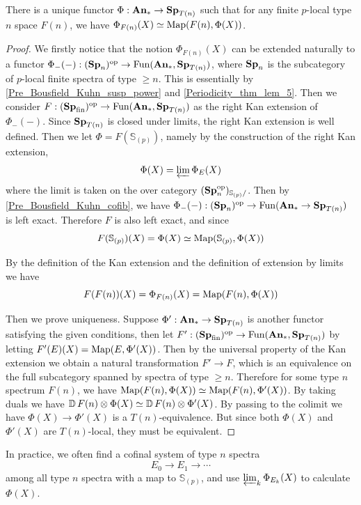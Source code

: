 	\begin{thm}\label{Bousfield_Kuhn_fun}
		There is a unique functor $\Phi:\mathbf{An}_*\to\mathbf{Sp}_{T(n)}$ such that for any finite $p$-local type $n$ space $F(n)$, we have $\Phi_{F(n)}(X)\simeq\operatorname{\mathrm{Map}}(F(n),\Phi(X))$. 
	\end{thm}
	\begin{proof}
		We firstly notice that the notion $\Phi_{F(n)}(X)$ can be extended naturally to a functor $\Phi_-(-):(\mathbf{Sp}_n)^{\operatorname{\mathrm{op}}}\to\operatorname{\mathrm{Fun}}(\mathbf{An}_*,\mathbf{Sp}_{T(n)})$, where $\mathbf{Sp}_n$ is the subcategory of $p$-local finite spectra of type $\geq n$. This is essentially by \cref{Pre_Bousfield_Kuhn_susp_power} and \cref{Periodicity_thm_lem_5}. Then we consider $F:(\mathbf{Sp}_\mathrm{fin})^{\operatorname{\mathrm{op}}}\to\operatorname{\mathrm{Fun}}(\mathbf{An}_*,\mathbf{Sp}_{T(n)})$ as the right Kan extension of $\Phi_-(-)$. Since $\mathbf{Sp}_{T(n)}$ is closed under limits, the right Kan extension is well defined. Then we let $\Phi=F(\mathbb{S}_{(p)})$, namely by the construction of the right Kan extension, 
		\[ \Phi(X)=\varprojlim\Phi_E(X) \]
		where the limit is taken on the over category $(\mathbf{Sp}_n^{\operatorname{\mathrm{op}}})_{\mathbb{S}_{(p)}/}$. Then by \cref{Pre_Bousfield_Kuhn_cofib}, we have $\Phi_-(-):(\mathbf{Sp}_n)^{\operatorname{\mathrm{op}}}\to\operatorname{\mathrm{Fun}}(\mathbf{An}_*\to\mathbf{Sp}_{T(n)})$ is left exact. Therefore $F$ is also left exact, and since 
		\[ F(\mathbb{S}_{(p)})(X)=\Phi(X)\simeq\operatorname{\mathrm{Map}}(\mathbb{S}_{(p)},\Phi(X)) \]

		By the definition of the Kan extension and the definition of extension by limits we have 
		\[ F(F(n))(X)=\Phi_{F(n)}(X)=\operatorname{\mathrm{Map}}(F(n),\Phi(X)) \]

		Then we prove uniqueness. Suppose $\Phi':\mathbf{An}_*\to\mathbf{Sp}_{T(n)}$ is another functor satisfying the given conditions, then let $F':(\mathbf{Sp}_{\mathrm{fin}})^{\operatorname{\mathrm{op}}}\to\operatorname{\mathrm{Fun}}(\mathbf{An}_*,\mathbf{Sp}_{T(n)})$ by letting $F'(E)(X)=\operatorname{\mathrm{Map}}(E,\Phi'(X))$. Then by the universal property of the Kan extension we obtain a natural transformation $F'\to F$, which is an equivalence on the full subcategory spanned by spectra of type $\geq n$. Therefore for some type $n$ spectrum $F(n)$, we have $\operatorname{\mathrm{Map}}(F(n),\Phi(X))\simeq\operatorname{\mathrm{Map}}(F(n),\Phi'(X))$. By taking duals we have $\operatorname{\mathbb{D}} F(n)\otimes\Phi(X)\simeq \operatorname{\mathbb{D}} F(n)\otimes\Phi'(X)$. By passing to the colimit we have $\Phi(X)\to\Phi'(X)$ is a $T(n)$-equivalence. But since both $\Phi(X)$ and $\Phi'(X)$ are $T(n)$-local, they must be equivalent. 
	\end{proof}

	\begin{remark}
		In practice, we often find a cofinal system of type $n$ spectra 
		\[ E_0\to E_1\to\cdots \]
		among all type $n$ spectra with a map to $\mathbb{S}_{(p)}$, and use $\varprojlim_k\Phi_{E_k}(X)$ to calculate $\Phi(X)$. 
	\end{remark}

